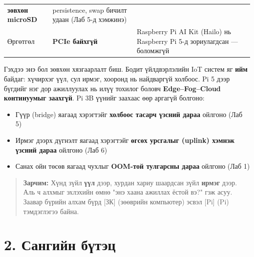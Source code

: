 \begin{longtable}[]{@{}lll@{}}
\begin{minipage}[t]{0.30\columnwidth}
\textbf{зөвхөн microSD}\strut
\end{minipage} & \begin{minipage}[t]{0.30\columnwidth}\raggedright
persistence, swap бичилт удаан (Лаб 5-д хэмжинэ)\strut
\end{minipage}\tabularnewline
\begin{minipage}[t]{0.30\columnwidth}\raggedright
Өргөтгөл\strut
\end{minipage} & \begin{minipage}[t]{0.30\columnwidth}\raggedright
\textbf{PCIe байхгүй}\strut
\end{minipage} & \begin{minipage}[t]{0.30\columnwidth}\raggedright
Raspberry Pi AI Kit (Hailo) нь Raspberry Pi 5-д зориулагдсан --- боломжгүй\strut
\end{minipage}\tabularnewline
\bottomrule
\end{longtable}\endgroup

Гэхдээ энэ бол зөвхөн хязгаарлалт биш. Бодит үйлдвэрлэлийн IoT систем яг \textbf{ийм} байдаг: хүчирхэг үүл, сул ирмэг, хооронд нь найдваргүй холбоос. Pi 5 дээр бүгдийг нэг дор ажиллуулах нь илүү тохилог боловч \textbf{Edge--Fog--Cloud континуумыг заахгүй}. Pi 3B үүнийг заахаас өөр аргагүй болгоно:

\begin{itemize}
\tightlist
\item
  Гүүр (bridge) яагаад хэрэгтэйг \textbf{холбоос тасарч үзсний дараа} ойлгоно (Лаб 5)
\item
  Ирмэг дээрх дүгнэлт яагаад хэрэгтэйг \textbf{өгсөх урсгалыг (uplink) хэмнэж үзсний дараа} ойлгоно (Лаб 6)
\item
  Санах ойн төсөв яагаад чухлыг \textbf{OOM-той тулгарсны дараа} ойлгоно (Лаб 1)
\end{itemize}

\begin{quote}
\textbf{Зарчим:} Хүнд зүйл \textbf{үүл} дээр, хурдан хариу шаардсан зүйл \textbf{ирмэг} дээр. Аль ч алхмыг эхлэхийн өмнө "энэ хаана ажиллах ёстой вэ?" гэж асуу. Заавар бүрийн алхам бүрд {[}ЗК{]} (зөөврийн компьютер) эсвэл {[}Pi{]} (Pi) тэмдэглэгээ байна.
\end{quote}

\hypertarget{ux441ux430ux43dux433ux438ux439ux43d-ux431ux4afux442ux44dux446}{%
\section{2. Сангийн бүтэц}\label{ux441ux430ux43dux433ux438ux439ux43d-ux431ux4afux442ux44dux446}}

